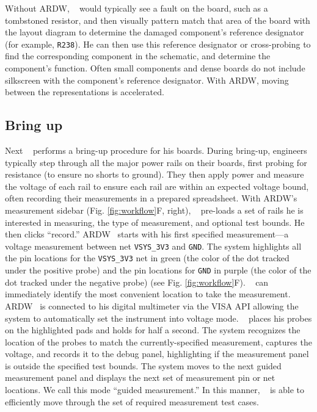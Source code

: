 \documentclass [11pt, proquest] {uwthesis}[2020/02/24]
\newcommand{\ARDWname}{ARDW}
\begin{document}
Without \ARDWname, \personname~ would typically see a fault on the board, such as a tombstoned resistor, and then visually pattern match that area of the board with the layout diagram to determine the damaged component's reference designator (for example, \verb|R238|). He can then use this reference designator or cross-probing to find the corresponding component in the schematic, and determine the component's function. Often small components and dense boards do not include silkscreen with the component's reference designator. With \ARDWname, moving between the representations is accelerated.

\subsection{Bring up}

Next \personname~ performs a bring-up procedure for his boards. During bring-up, engineers typically step through all the major power rails on their boards, first probing for resistance (to ensure no shorts to ground). They then apply power and measure the voltage of each rail to ensure each rail are within an expected voltage bound, often recording their measurements in a prepared spreadsheet. With \ARDWname’s measurement sidebar (Fig. \ref{fig:workflow}F, right), \personname~ pre-loads a set of rails he is interested in measuring, the type of measurement, and optional test bounds. He then clicks “record.” \ARDWname~ starts with his first specified measurement---a voltage measurement between net \verb|VSYS_3V3| and \verb|GND|. The system highlights all the pin locations for the \verb|VSYS_3V3| net in green (the color of the dot tracked under the positive probe) and the pin locations for \verb|GND| in purple (the color of the dot tracked under the negative probe)  (see Fig. \ref{fig:workflow}F). \personname~ can immediately identify the most convenient location to take the measurement. \ARDWname~ is connected to his digital multimeter via the VISA API allowing the system to automatically set the instrument into voltage mode. \personname~ places his probes on the highlighted pads and holds for half a second. The system recognizes the location of the probes to match the currently-specified measurement, captures the voltage, and records it to the debug panel, highlighting if the measurement panel is outside the specified test bounds.
The system moves to the next guided measurement panel and displays the next set of measurement pin or net locations.
We call this mode ``guided measurement.''
In this manner, \personname~ is able to efficiently move through the set of required measurement test cases.
\end{document}
